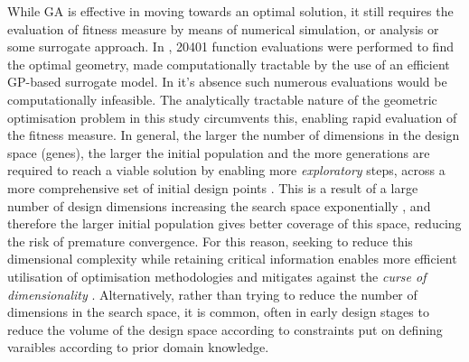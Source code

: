 \documentclass{article}
\begin{document}
While GA is effective in moving towards an optimal solution, it still requires the evaluation of fitness measure by means of numerical simulation, or analysis or some surrogate approach. In \cite{Taj2023}, 20401 function evaluations were performed to find the optimal geometry, made computationally  tractable by the use of an efficient GP-based surrogate model. In it's absence  such numerous evaluations would be computationally infeasible. The analytically tractable nature of the geometric optimisation problem in this study circumvents this, enabling rapid evaluation of the fitness measure. In general, the larger the number of dimensions in the design space (genes), the larger the initial population and the more generations are required to reach a viable solution by enabling more \textit{exploratory} steps, across a more comprehensive set of initial design points \citep{Gibbs2011}. This is a result of a large number of design dimensions increasing the search space exponentially \citep{Keogh2017}, and therefore the larger initial population gives better coverage of this space, reducing the risk of premature convergence. For this reason, seeking to reduce this dimensional complexity while retaining critical information enables more efficient utilisation of optimisation methodologies and mitigates against the \textit{curse of dimensionality} \citep{Serani2024}. Alternatively, rather than trying to reduce the number of dimensions in the search space, it is common, often in early design stages to reduce the volume of the design space according to constraints put on defining varaibles according to prior domain knowledge.
\end{document}
